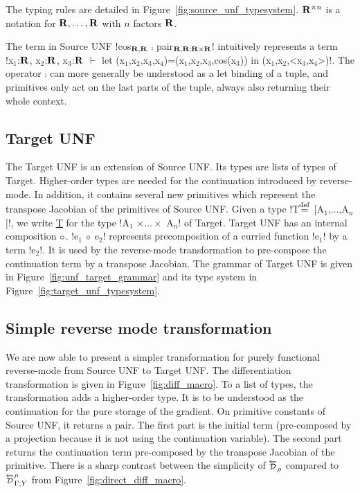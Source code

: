 The typing rules are detailed in Figure~\ref{fig:source_unf_typesystem}.
$\mathbf{R}^{\times n}$ is a notation for $\mathbf{R},\ldots,\mathbf{R}$ with $n$ factors $\mathbf{R}$.



\begin{example}
    The term in Source UNF !cos$_{\mathbf{R},\mathbf{R}}$ $\comp$ pair$_{\mathbf{R},\mathbf{R}; \mathbf{R}\times\mathbf{R}}$! 
    intuitively represents a term \\
    !x$_1$:$\mathbf{R}$, x$_2$:$\mathbf{R}$, x$_3$:$\mathbf{R}$ $\vdash$ let (x$_1$,x$_2$,x$_3$,x$_4$)=(x$_1$,x$_2$,x$_3$,cos(x$_3$)) in (x$_1$,x$_2$,<x$_3$,x$_4$>)!.
    The operator $\comp$ can more generally be understood as a let binding of a tuple, and primitives only act on the last parts of the tuple, always also returning their whole context.
\end{example}

\subsection{Target UNF} %
\label{sub:Target UNF}

The Target UNF is an extension of Source UNF. 
Its types are lists of types of Target. 
Higher-order types are needed for the continuation introduced by reverse-mode. 
In addition, it contains several new primitives which represent the transpose Jacobian of the primitives of Source UNF.
Given a type !T$\stackrel {\mathrm{def}}=$ [A$_1$,$\ldots$,A$_n$]!, we write \underline{T} for the type !A$_1$ $\times\ldots\times$ A$_n$! of Target. 
Target UNF has an internal composition $\circ$. 
!e$_{1}$ $\circ$ e$_{2}$! represents precomposition of a curried function !e$_{1}$! by a term !e$_{2}$!.
It is used by the reverse-mode transformation to pre-compose the continuation term by a transpose Jacobian.
The grammar of Target UNF is given in Figure~\ref{fig:unf_target_grammar} and its type system in Figure~\ref{fig:target_unf_typesystem}.





\subsection{Simple reverse mode transformation} %
\label{sub:Simple reverse mode transformation}

We are now able to present a simpler transformation for purely functional reverse-mode from Source UNF to Target UNF.
The differentiation transformation is given in Figure~\ref{fig:diff_macro}.
To a list of types, the transformation adds a higher-order type. 
It is to be understood as the continuation for the pure storage of the gradient.
On primitive constants of Source UNF, it returns a pair. 
The first part is the initial term (pre-composed by a projection because it is not using the continuation variable).
The second part returns the continuation term pre-composed by the transpose Jacobian of the primitive. 
There is a sharp contrast between the simplicity of $\Dsynrevsymbol_{\rho}$ compared to $\directD{\rho}{\Gamma}{Y}$ from Figure~\ref{fig:direct_diff_macro}.

